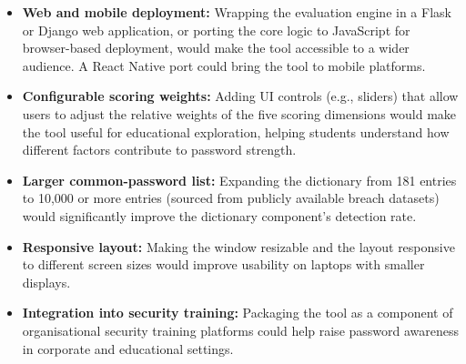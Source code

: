 \begin{itemize}
    \item \textbf{Web and mobile deployment:} Wrapping the evaluation engine in a Flask or Django web application, or porting the core logic to JavaScript for browser-based deployment, would make the tool accessible to a wider audience. A React Native port could bring the tool to mobile platforms.

    \item \textbf{Configurable scoring weights:} Adding UI controls (e.g., sliders) that allow users to adjust the relative weights of the five scoring dimensions would make the tool useful for educational exploration, helping students understand how different factors contribute to password strength.

    \item \textbf{Larger common-password list:} Expanding the dictionary from 181 entries to 10,000 or more entries (sourced from publicly available breach datasets) would significantly improve the dictionary component's detection rate.

    \item \textbf{Responsive layout:} Making the window resizable and the layout responsive to different screen sizes would improve usability on laptops with smaller displays.

    \item \textbf{Integration into security training:} Packaging the tool as a component of organisational security training platforms could help raise password awareness in corporate and educational settings.
\end{itemize}